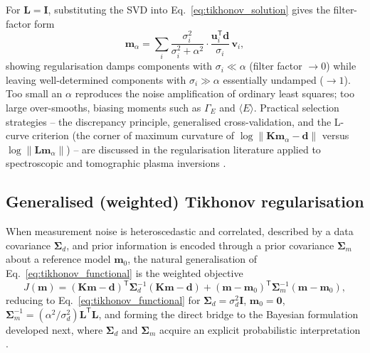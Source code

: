 For $\mathbf{L} = \mathbf{I}$, substituting the SVD into Eq.~\eqref{eq:tikhonov_solution} gives the filter-factor form
\begin{equation}
\mathbf{m}_{\alpha} = \sum_{i} \frac{\sigma_{i}^{2}}{\sigma_{i}^{2}+\alpha^{2}}\cdot\frac{\mathbf{u}_{i}^{\mathsf{T}}\mathbf{d}}{\sigma_{i}}\,\mathbf{v}_{i},
\label{eq:filter_factors}
\end{equation}
showing regularisation damps components with $\sigma_{i} \ll \alpha$ (filter factor $\to 0$) while leaving well-determined components with $\sigma_{i} \gg \alpha$ essentially undamped ($\to 1$). Too small an $\alpha$ reproduces the noise amplification of ordinary least squares; too large over-smooths, biasing moments such as $\Gamma_{E}$ and $\langle E\rangle$. Practical selection strategies -- the discrepancy principle, generalised cross-validation, and the L-curve criterion (the corner of maximum curvature of $\log\|\mathbf{K}\mathbf{m}_{\alpha}-\mathbf{d}\|$ versus $\log\|\mathbf{L}\mathbf{m}_{\alpha}\|$) -- are discussed in the regularisation literature applied to spectroscopic and tomographic plasma inversions \cite{ref0677,ref0695}.

\subsection{Generalised (weighted) Tikhonov regularisation}

When measurement noise is heteroscedastic and correlated, described by a data covariance $\boldsymbol{\Sigma}_{d}$, and prior information is encoded through a prior covariance $\boldsymbol{\Sigma}_{m}$ about a reference model $\mathbf{m}_{0}$, the natural generalisation of Eq.~\eqref{eq:tikhonov_functional} is the weighted objective
\begin{equation}
J(\mathbf{m}) = (\mathbf{K}\mathbf{m}-\mathbf{d})^{\mathsf{T}}\boldsymbol{\Sigma}_{d}^{-1}(\mathbf{K}\mathbf{m}-\mathbf{d}) + (\mathbf{m}-\mathbf{m}_{0})^{\mathsf{T}}\boldsymbol{\Sigma}_{m}^{-1}(\mathbf{m}-\mathbf{m}_{0}),
\label{eq:generalised_tikhonov}
\end{equation}
reducing to Eq.~\eqref{eq:tikhonov_functional} for $\boldsymbol{\Sigma}_{d} = \sigma_{d}^{2}\mathbf{I}$, $\mathbf{m}_{0}=\mathbf{0}$, $\boldsymbol{\Sigma}_{m}^{-1} = (\alpha^{2}/\sigma_{d}^{2})\mathbf{L}^{\mathsf{T}}\mathbf{L}$, and forming the direct bridge to the Bayesian formulation developed next, where $\boldsymbol{\Sigma}_{d}$ and $\boldsymbol{\Sigma}_{m}$ acquire an explicit probabilistic interpretation \cite{ref0683,ref0684,ref0685,ref0687}.

